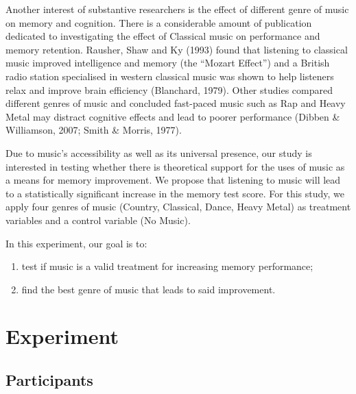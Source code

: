 \documentclass[]{article}
\providecommand{\tightlist}{%
  \setlength{\itemsep}{0pt}\setlength{\parskip}{0pt}}
\begin{document}
Another interest of substantive researchers is the effect of different
genre of music on memory and cognition. There is a considerable amount
of publication dedicated to investigating the effect of Classical music
on performance and memory retention. Rausher, Shaw and Ky (1993) found
that listening to classical music improved intelligence and memory (the
``Mozart Effect'') and a British radio station specialised in western
classical music was shown to help listeners relax and improve brain
efficiency (Blanchard, 1979). Other studies compared different genres of
music and concluded fast-paced music such as Rap and Heavy Metal may
distract cognitive effects and lead to poorer performance (Dibben \&
Williamson, 2007; Smith \& Morris, 1977).

Due to music's accessibility as well as its universal presence, our
study is interested in testing whether there is theoretical support for
the uses of music as a means for memory improvement. We propose that
listening to music will lead to a statistically significant increase in
the memory test score. For this study, we apply four genres of music
(Country, Classical, Dance, Heavy Metal) as treatment variables and a
control variable (No Music).

In this experiment, our goal is to:

\begin{enumerate}
\def\labelenumi{(\arabic{enumi})}
\tightlist
\item
  test if music is a valid treatment for increasing memory performance;
\item
  find the best genre of music that leads to said improvement.
\end{enumerate}

\section{Experiment}\label{experiment}

\subsection{Participants}\label{participants}
\end{document}
